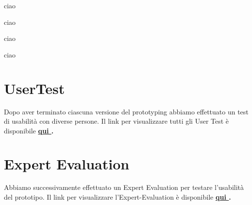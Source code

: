 \documentclass{article}
\begin{document}
\begin{minipage}{0.40\textwidth}
    ciao
    \vspace{1cm}
    
    ciao
    \vspace{1cm}
\end{minipage}    
\hspace{2cm}
\begin{minipage}{0.40\textwidth}
    ciao
    \vspace{1cm}

    ciao
    \vspace{1cm}
\end{minipage}
\section{UserTest} \par\vspace{0.5cm}

\par Dopo aver terminato ciascuna versione del prototyping abbiamo effettuato un test di usabilità con diverse persone.
Il link per visualizzare tutti gli User Test è disponibile \textbf{\href{https://www.notion.so/User-Testing-03a9697158cb4f93b3439fe694f33ac9}{qui }.}
\section{Expert Evaluation}
\par Abbiamo successivamente effettuato un Expert Evaluation per testare l'usabilità del prototipo.
Il link per visualizzare l'Expert-Evaluation è disponibile \textbf{\href{https://www.notion.so/Expert-Evaluation-7bc49cae89414742a51b71f6faebecdd}{qui }.}

\vspace{1cm}
\end{document}

